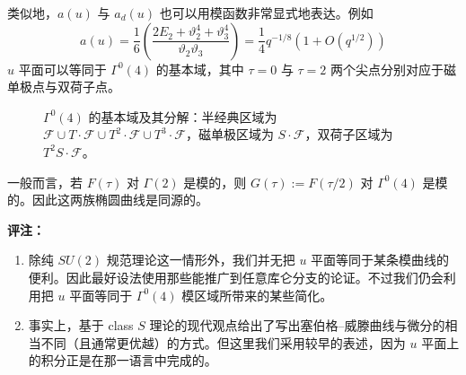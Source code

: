 类似地，$a(u)$ 与 $a_{d}(u)$ 也可以用模函数非常显式地表达。例如
\begin{equation}
a(u)=\frac{1}{6}\left(\frac{2E_{2}+\vartheta_{2}^{4}+\vartheta_{3}^{4}}{\vartheta_{2}\vartheta_{3}}\right)
=\frac{1}{4}q^{-1/8}\left(1+O(q^{1/2})\right)
\tag{5.42}
\end{equation}
$u$ 平面可以等同于 $\Gamma^{0}(4)$ 的基本域，其中 $\tau=0$ 与 $\tau=2$ 两个尖点分别对应于磁单极点与双荷子点。

\begin{figure}[H]
  \centering
  \caption{$\Gamma^{0}(4)$ 的基本域及其分解：半经典区域为 $\mathcal{F}\cup T\cdot\mathcal{F}\cup T^{2}\cdot\mathcal{F}\cup T^{3}\cdot\mathcal{F}$，磁单极区域为 $S\cdot\mathcal{F}$，双荷子区域为 $T^{2}S\cdot\mathcal{F}$。}
  \label{fig:gammazero4}
\end{figure}


一般而言，若 $F(\tau)$ 对 $\Gamma(2)$ 是模的，则 $G(\tau):=F(\tau/2)$ 对 $\Gamma^{0}(4)$ 是模的。因此这两族椭圆曲线是同源的。

\medskip
\noindent\textbf{评注：}
\begin{enumerate}[label=\arabic*., leftmargin=2.1em]
\item 除纯 $SU(2)$ 规范理论这一情形外，我们并无把 $u$ 平面等同于某条模曲线的便利。因此最好设法使用那些能推广到任意库仑分支的论证。不过我们仍会利用把 $u$ 平面等同于 $\Gamma^{0}(4)$ 模区域所带来的某些简化。
\item 事实上，基于 class $S$ 理论的现代观点给出了写出塞伯格--威滕曲线与微分的相当不同（且通常更优越）的方式。但这里我们采用较早的表述，因为 $u$ 平面上的积分正是在那一语言中完成的。
\end{enumerate}

